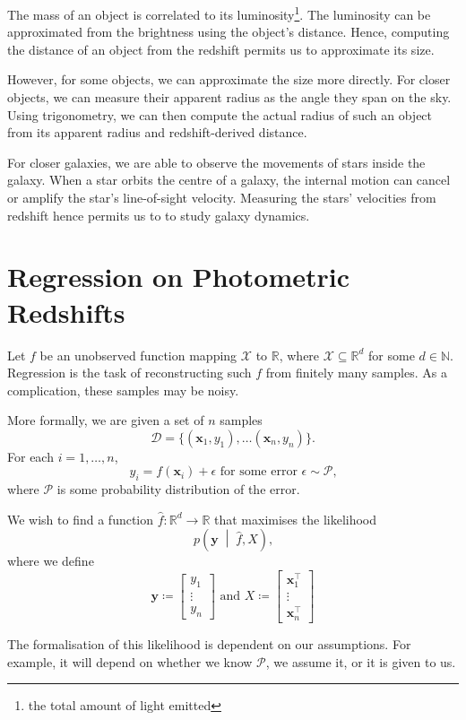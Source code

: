 \documentclass[11pt]{report}
\newcommand\bx{\mathbf{x}}
\newcommand\by{\mathbf{y}}
\newcommand\bbN{\mathbb{N}}
\newcommand\bbR{\mathbb{R}}
\newcommand\cD{\mathcal{D}}
\newcommand\cP{\mathcal{P}}
\newcommand\cX{\mathcal{X}}
\begin{document}
The mass of an object is correlated to its luminosity\footnote{the total amount of light emitted}. The luminosity can be approximated from the brightness using the object's distance. Hence, computing the distance of an object from the redshift permits us to approximate its size.

However, for some objects, we can approximate the size more directly. For closer objects, we can measure their apparent radius as the angle they span on the sky. Using trigonometry, we can then compute the actual radius of such an object from its apparent radius and redshift-derived distance.

For closer galaxies, we are able to observe the movements of stars inside the galaxy. When a star orbits the centre of a galaxy, the internal motion can cancel or amplify the star's line-of-sight velocity. Measuring the stars' velocities from redshift hence permits us to to study galaxy dynamics.

\chapter{Regression on Photometric Redshifts}
Let $f$ be an unobserved function mapping $\cX$ to $\bbR$, where $\cX \subseteq \bbR^d$ for some $d \in \bbN$. Regression is the task of reconstructing such $f$ from finitely many samples. As a complication, these samples may be noisy.

More formally, we are given a set of $n$ samples\[
    \cD = \{(\bx_1, y_1), \dots (\bx_n, y_n)\} \text{.}
\] For each $i = 1, \dots, n$, \[
    y_i = f(\bx_i) + \epsilon \text{ for some error } \epsilon \sim \cP \text{,}
\] where $\cP$ is some probability distribution of the error.

We wish to find a function $\hat f : \bbR^d \to \bbR$ that maximises the likelihood \[
    p\left(\by \;\middle|\; \hat f, X\right) \text{,}
\] where we define\[
    \by \coloneqq \begin{bmatrix} y_1 \\ \vdots \\ y_n \end{bmatrix}
    \text{ and }
    X \coloneqq \begin{bmatrix} \bx_1^\intercal \\ \vdots \\ \bx_n^\intercal \end{bmatrix}
\]

The formalisation of this likelihood is dependent on our assumptions. For example, it will depend on whether we know $\cP$, we assume it, or it is given to us.
\end{document}
